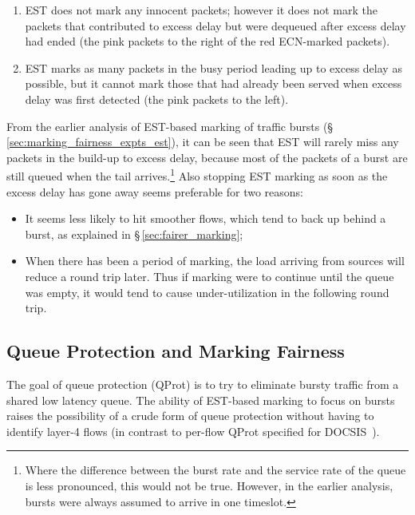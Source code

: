 \begin{enumerate}[nosep, label=Q\arabic*.]
	\item EST does not mark any innocent packets; however it does not mark the packets that contributed to excess delay but were dequeued after excess delay had ended (the pink packets to the right of the red ECN-marked packets). 
	\item EST marks as many packets in the busy period leading up to excess delay as possible, but it cannot mark those that had already been served when excess delay was first detected (the pink packets to the left).
\end{enumerate}
From the earlier analysis of EST-based marking of traffic bursts (\S\,\ref{sec:marking_fairness_expts_est}), it can be seen that EST will rarely miss any packets in the build-up to excess delay, because most of the packets of a burst are still queued when the tail arrives.\footnote{Where the difference between the burst rate and the service rate of the queue is less pronounced, this would not be true. However, in the earlier analysis, bursts were always assumed to arrive in one timeslot.} Also stopping EST marking as soon as the excess delay has gone away seems preferable for two reasons:
\begin{itemize}
	\item It seems less likely to hit smoother flows, which tend to back up behind a burst, as explained in \S\,\ref{sec:fairer_marking};
	\item When there has been a period of marking, the load arriving from sources will reduce a round trip later. Thus if marking were to continue until the queue was empty, it would tend to cause under-utilization in the following round trip.
\end{itemize}

\subsection{Queue Protection and Marking Fairness}\label{sec:qprot_marking_fairness}

The goal of queue protection (QProt) is to try to eliminate bursty traffic from a shared low latency queue. The ability of EST-based marking to focus on bursts raises the possibility of a crude form of queue protection without having to identify layer-4 flows (in contrast to per-flow QProt specified for DOCSIS~\cite{Briscoe19b:q-prot_ID}).


